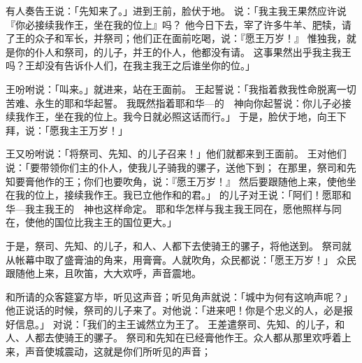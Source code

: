 {有人奏告王说：「先知{}来了。」{}进到王前，脸伏于地。
说：「我主我王果然应许{}说『你必接续我作王，坐在我的位上』吗？
他今日下去，宰了许多牛羊、肥犊，请了王的众子和军长，并祭司{}；他们正在{}面前吃喝，说：『愿{}王万岁！』
惟独我，就是你的仆人和祭司{}，{}的儿子{}，并王的仆人{}，他都没有请。
这事果然出乎我主我王吗？王却没有告诉仆人们，在我主我王之后谁坐你的位。」
\par }{\PP {}王吩咐说：「叫{}来。」{}就进来，站在王面前。
王起誓说：「我指着救我性命脱离一切苦难、永生的耶和华起誓。
我既然指着耶和华—{}的　神向你起誓说：你儿子{}必接续我作王，坐在我的位上。我今日就必照这话而行。」
于是，{}脸伏于地，向王下拜，说：「愿我主{}王万岁！」
\par }{\PP {}王又吩咐说：「将祭司{}、先知{}、{}的儿子{}召来！」他们就都来到王面前。
王对他们说：「要带领你们主的仆人，使我儿子{}骑我的骡子，送他下到{}；
在那里，祭司{}和先知{}要膏他作{}的王；你们也要吹角，说：『愿{}王万岁！』
然后要跟随他上来，使他坐在我的位上，接续我作王。我已立他作{}和{}的君。」
的儿子{}对王说：「阿们！愿耶和华—我主我王的　神也这样命定。
耶和华怎样与我主我王同在，愿他照样与{}同在，使他的国位比我主{}王的国位更大。」
\par }{\PP {}于是，祭司{}、先知{}、{}的儿子{}，和{}人、{}人都下去使{}骑{}王的骡子，将他送到{}。
祭司{}就从帐幕中取了盛膏油的角来，用膏膏{}。人就吹角，众民都说：「愿{}王万岁！」
众民跟随他上来，且吹笛，大大欢呼，声音震地。
\par }{\PP {}和所请的众客筵宴方毕，听见这声音；{}听见角声就说：「城中为何有这响声呢？」
他正说话的时候，祭司{}的儿子{}来了。{}对他说：「进来吧！你是个忠义的人，必是报好信息。」
对{}说：「我们的主{}王诚然立{}为王了。
王差遣祭司{}、先知{}、{}的儿子{}，和{}人、{}人都去使{}骑王的骡子。
祭司{}和先知{}在{}已经膏他作王。众人都从那里欢呼着上来，声音使城震动，这就是你们所听见的声音；
}
